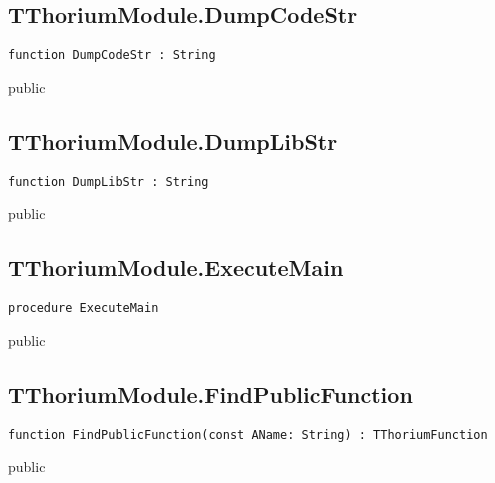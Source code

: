 \subsection{TThoriumModule.DumpCodeStr}
\label{thoriumcore:thorium:tthoriummodule:dumpcodestr}
\begin{FPCList}
\Synopsis
\Declaration 

\begin{verbatim}
function DumpCodeStr : String
\end{verbatim}
\Visibility
public
\Description
\Errors
\end{FPCList}
\subsection{TThoriumModule.DumpLibStr}
\label{thoriumcore:thorium:tthoriummodule:dumplibstr}
\begin{FPCList}
\Synopsis
\Declaration 

\begin{verbatim}
function DumpLibStr : String
\end{verbatim}
\Visibility
public
\Description
\Errors
\end{FPCList}
\subsection{TThoriumModule.ExecuteMain}
\label{thoriumcore:thorium:tthoriummodule:executemain}
\begin{FPCList}
\Synopsis
\Declaration 

\begin{verbatim}
procedure ExecuteMain
\end{verbatim}
\Visibility
public
\Description
\Errors
\end{FPCList}
\subsection{TThoriumModule.FindPublicFunction}
\label{thoriumcore:thorium:tthoriummodule:findpublicfunction}
\begin{FPCList}
\Synopsis
\Declaration 

\begin{verbatim}
function FindPublicFunction(const AName: String) : TThoriumFunction
\end{verbatim}
\Visibility
public
\Description
\Errors
\end{FPCList}
